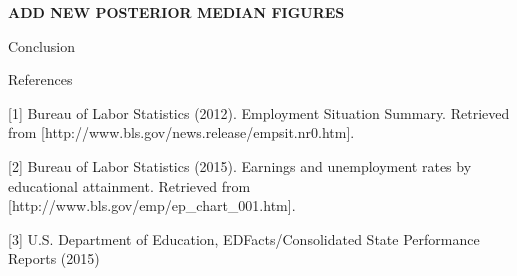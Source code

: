 \documentclass[12pt,letterpaper]{article}
\begin{document}
\begin{center}
\LARGE\textbf{ADD NEW POSTERIOR MEDIAN FIGURES}
\end{center}

\begin{flushleft}
\LARGE{Conclusion}
\end{flushleft}



\begin{flushleft}
\LARGE{References}
\end{flushleft}

[1] Bureau of Labor Statistics  (2012). Employment Situation Summary. Retrieved from [http://www.bls.gov/news.release/empsit.nr0.htm].

[2] Bureau of Labor Statistics  (2015). Earnings and unemployment rates by educational attainment. Retrieved from [http://www.bls.gov/emp/ep\_chart\_001.htm].

[3] U.S. Department of Education, EDFacts/Consolidated State Performance Reports (2015)
\end{document}
